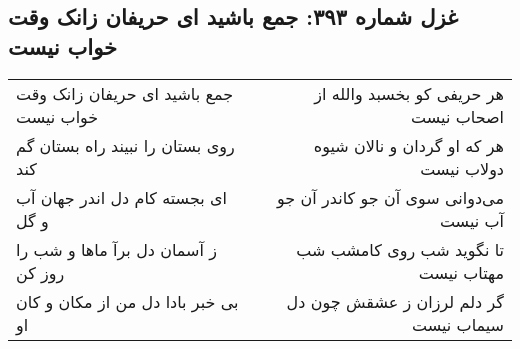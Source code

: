 \begin{center}
\section*{غزل شماره ۳۹۳: جمع باشید ای حریفان زانک وقت خواب نیست}
\label{sec:0393}
\begin{longtable}{l p{0.5cm} r}
جمع باشید ای حریفان زانک وقت خواب نیست
&&
هر حریفی کو بخسبد والله از اصحاب نیست
\\
روی بستان را نبیند راه بستان گم کند
&&
هر که او گردان و نالان شیوه دولاب نیست
\\
ای بجسته کام دل اندر جهان آب و گل
&&
می‌دوانی سوی آن جو کاندر آن جو آب نیست
\\
ز آسمان دل برآ ماها و شب را روز کن
&&
تا نگوید شب روی کامشب شب مهتاب نیست
\\
بی خبر بادا دل من از مکان و کان او
&&
گر دلم لرزان ز عشقش چون دل سیماب نیست
\\
\end{longtable}
\end{center}
